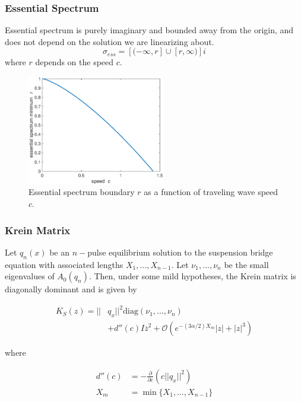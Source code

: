 \documentclass[16pt]{beamer}
\begin{document}
\begin{frame}
\frametitle{Essential Spectrum}
	Essential spectrum is purely imaginary and bounded away from the origin, and does not depend on the solution we are linearizing about.
	\[ \sigma_{ess} = [ (-\infty, r] \cup [r, \infty) ]i \]
	where $r$ depends on the speed $c$.
	\begin{figure}
	\begin{center}
	\includegraphics[width=6cm]{images/essspecboundary.eps}
	\caption{Essential spectrum boundary $r$ as a function of traveling wave speed $c$.}
	\end{center}
	\end{figure}
\end{frame}

\begin{frame}
\frametitle{Krein Matrix}
	\begin{theorem}[Kapitula et. al., 2019]
	Let $q_n(x)$ be an $n-$pulse equilibrium solution to the suspension bridge equation with associated lengths $X_1, \dots, X_{n-1}$. Let $\nu_1, \dots, \nu_n$ be the small eigenvalues of $A_0(q_n)$. Then, under some mild hypotheses, the Krein matrix is diagonally dominant and is given by

    \begin{align*}\label{Kreinapprox}
    K_S(z) = ||&q_x||^2 \text{diag} (\nu_1, \dots, \nu_n) \\
     &+ d''(c) I \overline{z}^2 + \mathcal{O}(e^{-(3 \alpha/2) X_m}|z| + |z|^3)
    \end{align*}

    where

    \begin{align*}
    d''(c) &= -\frac{\partial}{\partial c} \left( c ||q_x||^2 \right) \\
    X_m &= \min\{ X_1, \dots, X_{n-1} \} 
    \end{align*}
	\end{theorem}
\end{frame}
\end{document}
